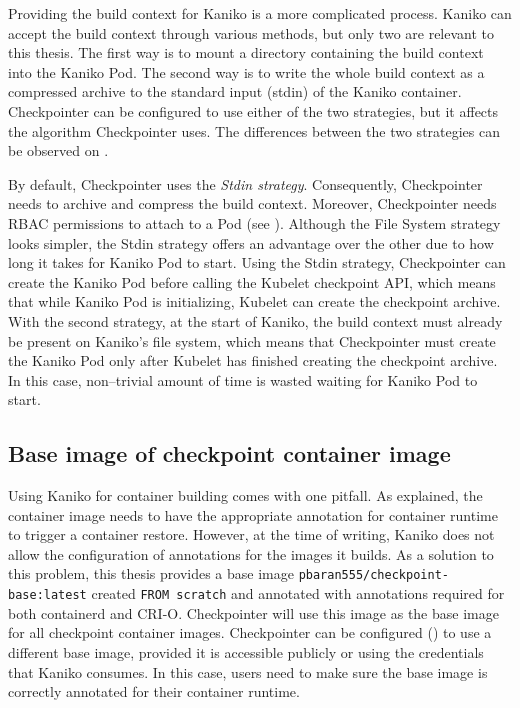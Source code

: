 \documentclass[
  digital,     %
  oneside,     %
  nosansbold,  %
  nocolorbold, %
  lof,         %
  nolot,         %
]{fithesis4}
\begin{document}
Providing the build context for Kaniko is a more complicated process. Kaniko can accept the build context through various methods, but only two are relevant to this thesis. The first way is to mount a directory containing the build context into the Kaniko Pod. The second way is to write the whole build context as a compressed archive to the standard input (stdin) of the Kaniko container. Checkpointer can be configured to use either of the two strategies, but it affects the algorithm Checkpointer uses. The differences between the two strategies can be observed on .


By default, Checkpointer uses the \emph{Stdin strategy}. Consequently, Checkpointer needs to archive and compress the build context. Moreover, Checkpointer needs RBAC permissions to attach to a Pod (see ). Although the File System strategy looks simpler, the Stdin strategy offers an advantage over the other due to how long it takes for Kaniko Pod to start. Using the Stdin strategy, Checkpointer can create the Kaniko Pod before calling the Kubelet checkpoint API, which means that while Kaniko Pod is initializing, Kubelet can create the checkpoint archive. With the second strategy, at the start of Kaniko, the build context must already be present on Kaniko's file system, which means that Checkpointer must create the Kaniko Pod only after Kubelet has finished creating the checkpoint archive. In this case, non--trivial amount of time is wasted waiting for Kaniko Pod to start.

\subsection{Base image of checkpoint container image}
\label{sec:base-image}
Using Kaniko for container building comes with one pitfall. As  explained, the container image needs to have the appropriate annotation for container runtime to trigger a container restore. However, at the time of writing, Kaniko does not allow the configuration of annotations for the images it builds. As a solution to this problem, this thesis provides a base image \texttt{pbaran555/checkpoint-base:latest} created \texttt{FROM scratch} and annotated with annotations required for both containerd and CRI-O. Checkpointer will use this image as the base image for all checkpoint container images. Checkpointer can be configured () to use a different base image, provided it is accessible publicly or using the credentials that Kaniko consumes. In this case, users need to make sure the base image is correctly annotated for their container runtime.
\end{document}
